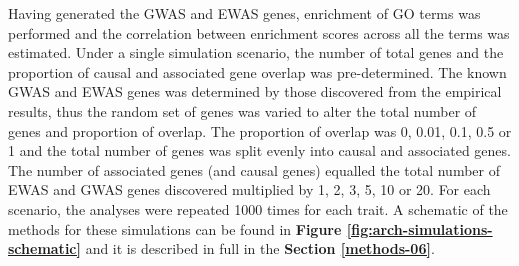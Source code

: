 \documentclass[11pt,oneside]{bristolthesis}
\begin{document}
Having generated the GWAS and EWAS genes, enrichment of GO terms was performed and the correlation between enrichment scores across all the terms was estimated. Under a single simulation scenario, the number of total genes and the proportion of causal and associated gene overlap was pre-determined. The known GWAS and EWAS genes was determined by those discovered from the empirical results, thus the random set of genes was varied to alter the total number of genes and proportion of overlap. The proportion of overlap was 0, 0.01, 0.1, 0.5 or 1 and the total number of genes was split evenly into causal and associated genes. The number of associated genes (and causal genes) equalled the total number of EWAS and GWAS genes discovered multiplied by 1, 2, 3, 5, 10 or 20. For each scenario, the analyses were repeated 1000 times for each trait. A schematic of the methods for these simulations can be found in \textbf{Figure \ref{fig:arch-simulations-schematic}} and it is described in full in the \textbf{Section \ref{methods-06}}.
\end{document}
